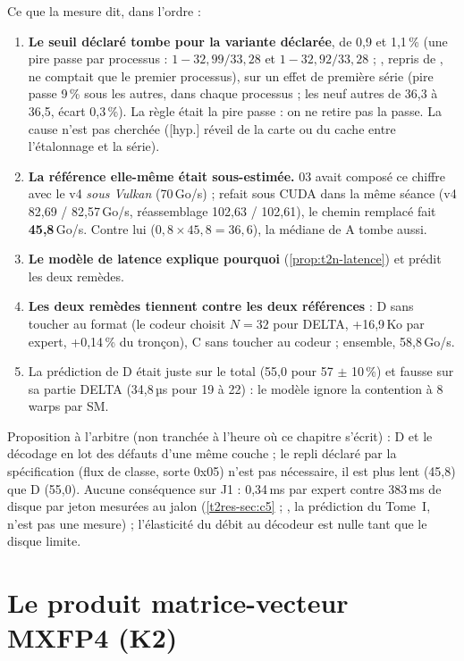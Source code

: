 Ce que la mesure dit, dans l'ordre :
\begin{enumerate}
\item \textbf{Le seuil déclaré tombe pour la variante déclarée}, de 0,9 et 1,1\,\% (une pire passe par processus : $1 - 32{,}99/33{,}28$ et $1 - 32{,}92/33{,}28$ \calc ; , repris de , ne comptait que le premier processus), sur un effet de première série (pire passe 9\,\% sous les autres, dans chaque processus ; les neuf autres de 36,3 à 36,5, écart 0,3\,\%). La règle était la pire passe : on ne retire pas la passe. La cause n'est pas cherchée ([hyp.] réveil de la carte ou du cache entre l'étalonnage et la série).
\item \textbf{La référence elle-même était sous-estimée.}  03 avait composé ce chiffre avec le v4 \emph{sous Vulkan} (70\,Go/s) ; refait sous CUDA dans la même séance (v4 82,69 / 82,57\,Go/s, réassemblage 102,63 / 102,61), le chemin remplacé fait \textbf{45,8}\,Go/s. Contre lui ($0{,}8 \times 45{,}8 = 36{,}6$), la médiane de A tombe aussi.
\item \textbf{Le modèle de latence explique pourquoi} (\cref{prop:t2n-latence}) et prédit les deux remèdes.
\item \textbf{Les deux remèdes tiennent contre les deux références} : D sans toucher au format (le codeur choisit $N = 32$ pour DELTA, +16,9\,Ko par expert, +0,14\,\% du tronçon), C sans toucher au codeur ; ensemble, 58,8\,Go/s.
\item La prédiction de D était juste sur le total (55,0 pour 57 $\pm$ 10\,\%) et fausse sur sa partie DELTA (34,8\,µs pour 19 à 22) : le modèle ignore la contention à 8 warps par SM.
\end{enumerate}
Proposition à l'arbitre (non tranchée à l'heure où ce chapitre s'écrit) : D et le décodage en lot des défauts d'une même couche ; le repli déclaré par la spécification (flux de classe, sorte 0x05) n'est pas nécessaire, il est plus lent (45,8) que D (55,0). Aucune conséquence sur J1 : 0,34\,ms par expert contre 383\,ms de disque par jeton mesurées au jalon (\cref{t2res-sec:c5} ; , la prédiction du Tome~I, n'est pas une mesure) ; l'élasticité du débit au décodeur est nulle tant que le disque limite.

\section{Le produit matrice-vecteur MXFP4 (K2)}\label{sec:t2n-gemv}


